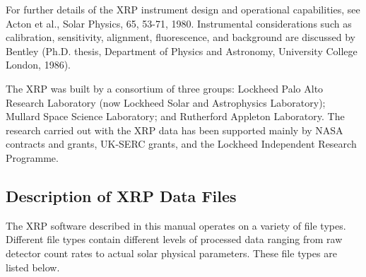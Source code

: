 For further details of the XRP instrument design and operational capabilities,
see Acton et al., Solar Physics, 65, 53-71, 1980. Instrumental considerations
such as calibration, sensitivity, alignment, fluorescence, and background are
discussed by Bentley (Ph.D. thesis, Department of Physics and Astronomy,
University College London, 1986).

The XRP was built by a consortium of three groups: Lockheed Palo Alto Research
Laboratory (now Lockheed Solar and Astrophysics Laboratory); Mullard Space
Science Laboratory; and Rutherford Appleton Laboratory. The research carried
out with the XRP data has been supported mainly by NASA contracts and grants,
UK-SERC grants, and the Lockheed Independent Research Programme.

\newpage

\subsection{Description of XRP Data Files}

The XRP software described in this manual operates on a variety of
file types. Different file types contain different levels of processed
data ranging from raw detector count rates to actual solar physical parameters.
These file types are listed below.

